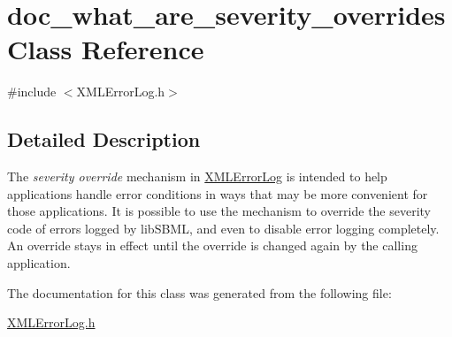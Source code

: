 \hypertarget{classdoc__what__are__severity__overrides}{}\section{doc\+\_\+what\+\_\+are\+\_\+severity\+\_\+overrides Class Reference}
\label{classdoc__what__are__severity__overrides}


{\ttfamily \#include $<$X\+M\+L\+Error\+Log.\+h$>$}



\subsection{Detailed Description}
\begin{DoxyParagraph}{}
The {\itshape severity override} mechanism in \hyperlink{class_x_m_l_error_log}{X\+M\+L\+Error\+Log} is intended to help applications handle error conditions in ways that may be more convenient for those applications. It is possible to use the mechanism to override the severity code of errors logged by lib\+S\+B\+ML, and even to disable error logging completely. An override stays in effect until the override is changed again by the calling application. 
\end{DoxyParagraph}


The documentation for this class was generated from the following file\+:\begin{DoxyCompactItemize}
\item 
\hyperlink{_x_m_l_error_log_8h}{X\+M\+L\+Error\+Log.\+h}\end{DoxyCompactItemize}
